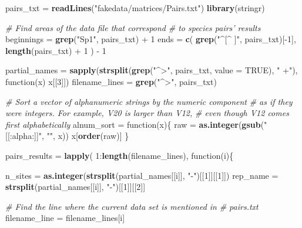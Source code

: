 \documentclass[11pt,]{article}
\newenvironment{Shaded}{\begin{snugshade}}{\end{snugshade}}
\newcommand{\KeywordTok}[1]{\textcolor[rgb]{0.13,0.29,0.53}{\textbf{{#1}}}}
\newcommand{\DataTypeTok}[1]{\textcolor[rgb]{0.13,0.29,0.53}{{#1}}}
\newcommand{\DecValTok}[1]{\textcolor[rgb]{0.00,0.00,0.81}{{#1}}}
\newcommand{\StringTok}[1]{\textcolor[rgb]{0.31,0.60,0.02}{{#1}}}
\newcommand{\CommentTok}[1]{\textcolor[rgb]{0.56,0.35,0.01}{\textit{{#1}}}}
\newcommand{\OtherTok}[1]{\textcolor[rgb]{0.56,0.35,0.01}{{#1}}}
\newcommand{\NormalTok}[1]{{#1}}
\begin{document}
\begin{Shaded}
\begin{Highlighting}[]
\NormalTok{pairs_txt =}\StringTok{ }\KeywordTok{readLines}\NormalTok{(}\StringTok{"fakedata/matrices/Pairs.txt"}\NormalTok{)}
\KeywordTok{library}\NormalTok{(stringr)}

\CommentTok{# Find areas of the data file that correspond}
\CommentTok{# to species pairs' results}
\NormalTok{beginnings =}\StringTok{ }\KeywordTok{grep}\NormalTok{(}\StringTok{"Sp1"}\NormalTok{, pairs_txt) +}\StringTok{ }\DecValTok{1}
\NormalTok{ends =}\StringTok{ }\KeywordTok{c}\NormalTok{(}
  \KeywordTok{grep}\NormalTok{(}\StringTok{"^[^ ]"}\NormalTok{, pairs_txt)[-}\DecValTok{1}\NormalTok{],}
  \KeywordTok{length}\NormalTok{(pairs_txt) +}\StringTok{ }\DecValTok{1}
\NormalTok{) -}\StringTok{ }\DecValTok{1}

\NormalTok{partial_names =}\StringTok{ }\KeywordTok{sapply}\NormalTok{(}\KeywordTok{strsplit}\NormalTok{(}\KeywordTok{grep}\NormalTok{(}\StringTok{"^>"}\NormalTok{, pairs_txt, }\DataTypeTok{value =} \OtherTok{TRUE}\NormalTok{), }\StringTok{" +"}\NormalTok{), function(x) x[[}\DecValTok{3}\NormalTok{]])}
\NormalTok{filename_lines =}\StringTok{ }\KeywordTok{grep}\NormalTok{(}\StringTok{"^>"}\NormalTok{, pairs_txt)}

\CommentTok{# Sort a vector of alphanumeric strings by the numeric component}
\CommentTok{# as if they were integers.  For example, V20 is larger than V12,}
\CommentTok{# even though V12 comes first alphabetically}
\NormalTok{alnum_sort =}\StringTok{ }\NormalTok{function(x)\{}
  \NormalTok{raw =}\StringTok{ }\KeywordTok{as.integer}\NormalTok{(}\KeywordTok{gsub}\NormalTok{(}\StringTok{"[[:alpha:]]"}\NormalTok{, }\StringTok{""}\NormalTok{, x))}
  \NormalTok{x[}\KeywordTok{order}\NormalTok{(raw)]}
\NormalTok{\}}

\NormalTok{pairs_results =}\StringTok{ }\KeywordTok{lapply}\NormalTok{(}
  \DecValTok{1}\NormalTok{:}\KeywordTok{length}\NormalTok{(filename_lines),}
  \NormalTok{function(i)\{}
    
    \NormalTok{n_sites =}\StringTok{ }\KeywordTok{as.integer}\NormalTok{(}\KeywordTok{strsplit}\NormalTok{(partial_names[[i]], }\StringTok{"-"}\NormalTok{)[[}\DecValTok{1}\NormalTok{]][[}\DecValTok{1}\NormalTok{]])}
    \NormalTok{rep_name =}\StringTok{ }\KeywordTok{strsplit}\NormalTok{(partial_names[[i]], }\StringTok{"-"}\NormalTok{)[[}\DecValTok{1}\NormalTok{]][[}\DecValTok{2}\NormalTok{]]}
    
    
    \CommentTok{# Find the line where the current data set is mentioned in}
    \CommentTok{# pairs.txt}
    \NormalTok{filename_line =}\StringTok{ }\NormalTok{filename_lines[i]}
    

\end{Highlighting}
\end{Shaded}
\end{document}
